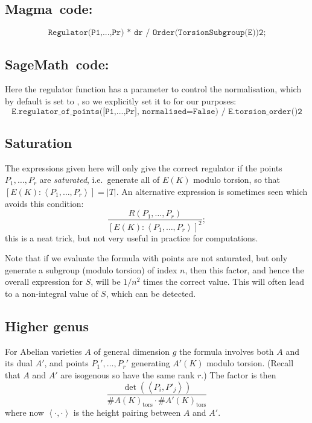 \documentclass{amsart}
\newcommand{\software}[1]{\textsf{#1}} %
\newcommand{\Sage}{\software{SageMath}}
\newcommand{\Magma}{\software{Magma}{}}
\DeclareMathOperator{\tors}{tors}
\begin{document}
\subsection{\Magma\ code:}\label{magma-3}

\[
\texttt{Regulator(P1,...,Pr)\ *\ d\^{}r\ /\ Order(TorsionSubgroup(E))\^{}2;}
\]

\subsection{\Sage\ code:}\label{sage-3}
Here the regulator function has a parameter to control the
normalisation, which by default is set to , so we
explicitly set it to  for our purposes:
\[
\texttt{E.regulator\_of\_points({[}P1,...,Pr{]}, normalised=False)\ /\ E.torsion\_order()\^{}2}
\]

\subsection{Saturation}
The expressions given here will only give the correct regulator if the
points \(P_1,\dots,P_r\) are \emph{saturated}, i.e.~generate all of
\(E(K)\) modulo torsion, so that \([E(K):\left\langle
  P_1,\dots,P_r\right\rangle] = |T|\). An alternative expression is
sometimes seen which avoids this condition:
\[\frac{R(P_1,\dots,P_r)}{[E(K):\left\langle P_1,\dots,P_r\right\rangle]^2};\]
this is a neat trick, but not very useful in practice for computations.

Note that if we evaluate the formula with points are not saturated,
but only generate a subgroup (modulo torsion) of index \(n\), then
this factor, and hence the overall expression for \(S\), will be
\(1/n^2\) times the correct value. This will often lead to a
non-integral value of \(S\), which can be detected.

\subsection{Higher genus}\label{higher-genus}

For Abelian varieties \(A\) of general dimension \(g\) the formula
involves both \(A\) and its dual \(A'\), and points \(P_1',\dots,P_r'\)
generating \(A'(K)\) modulo torsion. (Recall that \(A\) and \(A'\) are
isogenous so have the same rank \(r\).) The factor is then
\[\frac{\det(\left\langle P_i,P'_j\right\rangle )}{\#A(K)_{\tors}\cdot \#A'(K)_{\tors}}\]
where now \(\left<\cdot,\cdot\right>\) is the height pairing between
\(A\) and \(A'\).
\end{document}
